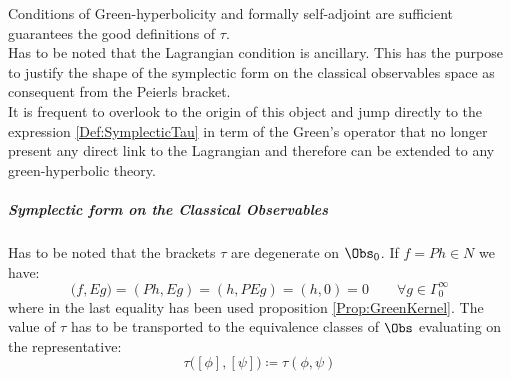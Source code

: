 \documentclass[Main]{subfiles}
\begin{document}
							Conditions of Green-hyperbolicity and formally self-adjoint are sufficient guarantees the good definitions of $\tau$.\\
							Has to be noted that the Lagrangian condition is ancillary. This has the purpose to justify the shape of the symplectic form on the classical observables space as consequent from the Peierls bracket.
							\\
							It is frequent\cite{Dewitt1999}\cite{Benini} to overlook to the origin of this object and jump directly to the expression \ref{Def:SymplecticTau}  in term of the Green's operator that no longer present any direct link to the Lagrangian and therefore can be extended to any green-hyperbolic theory.
		
			\subparagraph{Symplectic form on the Classical Observables}
				Has to be noted that the brackets $\tau$ are degenerate on $\Obs_0$. 
				If $f=Ph \in N$ we have:
				\begin{displaymath}
					\big( f , E g \big) = (P h , E g) = (h, PE g) = (h,0) = 0 \qquad \forall g \in \Gamma_0^\infty
				\end{displaymath}
				where in the last equality has been used proposition \ref{Prop:GreenKernel}.
				The value of $\tau$ has to be transported to the equivalence classes of $\Obs$ evaluating on the representative:
				\begin{equation}
					\tau\big( [\phi], [\psi] \big) \coloneqq \tau(\phi, \psi)
				\end{equation}
				
\end{document}
